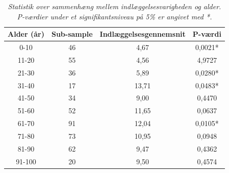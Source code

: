 \begin{table}[H]
\centering
\begin{tabular}{|c|c|c|c|}
\hline
\multicolumn{1}{|l|}{\textbf{Alder (år)}} & \multicolumn{1}{l|}{\textbf{Sub-sample}} & \multicolumn{1}{l|}{\textbf{Indlæggelsesgennemsnit}} & \multicolumn{1}{l|}{\textbf{P-værdi}} \\ \hline
0-10                                      & 46                                       & 4,67                                                 & 0,0021*                               \\ \hline
11-20                                     & 55                                       & 4,56                                                 & 4,9727                                \\ \hline
21-30                                     & 36                                       & 5,89                                                 & 0,0280*                               \\ \hline
31-40                                     & 17                                       & 13,71                                                & 0,0483*                               \\ \hline
41-50                                     & 34                                       & 9,00                                                 & 0,4470                                \\ \hline
51-60                                     & 52                                       & 11,65                                                & 0,0637                                \\ \hline
61-70                                     & 91                                       & 12,04                                                & 0,0105*                               \\ \hline
71-80                                     & 73                                       & 10,95                                                & 0,0948                                \\ \hline
81-90                                     & 62                                       & 9,47                                                 & 0,4362                            \\ \hline
91-100                                    & 20                                       & 9,50                                                 & 0,4574                                \\ \hline
\end{tabular}
\caption{\textit{Statistik over sammenhæng mellem indlæggelsesvarigheden og alder. P-værdier under et signifikantsniveau på 5\% er angivet med *.}}
\label{alderogindlaegtab}
\end{table}

